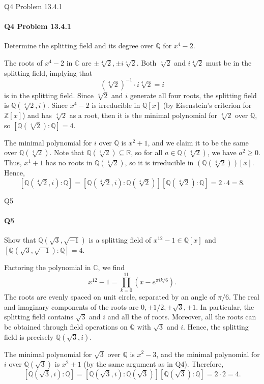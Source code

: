 \documentclass[12pt]{article}
\newenvironment{fullbox}{\begin{lrbox}{\savefullbox}\begin{minipage}{\dimexpr\textwidth-2\fboxsep\relax}}{\end{minipage}\end{lrbox}\begin{center}\framebox[\textwidth]{\usebox{\savefullbox}}\end{center}}
\newenvironment{pbox}[1][]{\begin{fullbox}\ifx#1\empty\else\paragraph{#1}\fi}{\end{fullbox}}
\theoremstyle{definition}
\newcommand{\Z}{\mathbb{Z}}
\newcommand{\Q}{\mathbb{Q}}
\newcommand{\R}{\mathbb{R}}
\newcommand{\C}{\mathbb{C}}
\begin{document}
\newpage
\begin{pbox}[Q4 Problem 13.4.1]
    Determine the splitting field and its degree over $\Q$ for $x^4 - 2$.
\end{pbox}

The roots of $x^4 - 2$ in $\C$ are $\pm\sqrt[4]{2}, \pm i\sqrt[4]{2}$. Both $\sqrt[4]{2}$ and $i\sqrt[4]{2}$ must be in the splitting field, implying that
\[
    (\sqrt[4]{2})^{-1} \cdot i\sqrt[4]{2} = i
\]
is in the splitting field. Since $\sqrt[4]{2}$ and $i$ generate all four roots, the splitting field is $\Q(\sqrt[4]{2}, i)$. Since  $x^4 - 2$ is irreducible in $\Q[x]$ (by Eisenstein's criterion for $\Z[x]$) and has $\sqrt[4]{2}$ as a root, then it is the minimal polynomial for $\sqrt[4]{2}$ over $\Q$, so $[\Q(\sqrt[4]{2}) : \Q] = 4$.

The minimal polynomial for $i$ over $\Q$ is $x^2 + 1$, and we claim it to be the same over $\Q(\sqrt[4]{2})$. Note that $\Q(\sqrt[4]{2}) \subseteq \R$, so for all $a \in \Q(\sqrt[4]{2})$, we have $a^2 \geq 0$. Thus, $x^1 + 1$ has no roots in $\Q(\sqrt[4]{2})$, so it is irreducible in $(\Q(\sqrt[4]{2}))[x]$. Hence,
\[
    [\Q(\sqrt[4]{2}, i) : \Q] = [\Q(\sqrt[4]{2}, i) : \Q(\sqrt[4]{2})][\Q(\sqrt[4]{2}) : \Q] = 2 \cdot 4 = 8.
\]




\begin{pbox}[Q5]
    Show that $\Q(\sqrt{3}, \sqrt{-1})$ is a splitting field of $x^{12} - 1 \in \Q[x]$ and $[\Q(\sqrt{3}, \sqrt{-1}) : \Q] = 4$.
\end{pbox}

Factoring the polynomial in $\C$, we find
\[
    x^{12} - 1 = \prod_{k = 0}^{11} (x - e^{\pi i k/6}).
\]
The roots are evenly spaced on unit circle, separated by an angle of $\pi/6$. The real and imaginary components of the roots are $0, \pm1/2, \pm\sqrt{3}, \pm 1$. In particular, the splitting field contains $\sqrt{3}$ and $i$ and all the of roots. Moreover, all the roots can be obtained through field operations on $\Q$ with $\sqrt{3}$ and $i$. Hence, the splitting field is precisely $\Q(\sqrt{3}, i)$. 

The minimal polynomial for $\sqrt{3}$ over $\Q$ is $x^2 - 3$, and the minimal polynomial for $i$ over $\Q(\sqrt{3})$ is $x^2 + 1$ (by the same argument as in Q4). Therefore,
\[
    [\Q(\sqrt{3}, i) : \Q] = [\Q(\sqrt{3}, i) : \Q(\sqrt{3})][\Q(\sqrt{3}) : \Q] = 2 \cdot 2 = 4.
\]
\end{document}
